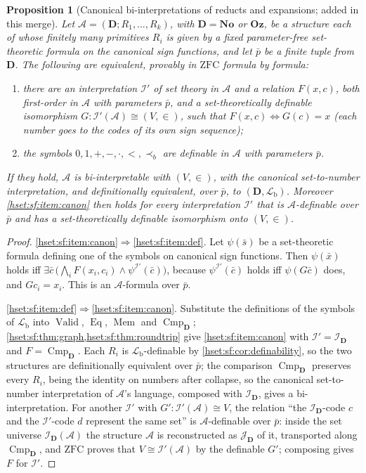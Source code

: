 \documentclass[11pt,letterpaper]{article}
\newtheorem{proposition}[proposition]{Proposition}\aliascntresetthe{proposition}
\theoremstyle{definition}
\theoremstyle{remark}
\newcommand{\No}{\mathbf{No}}
\newcommand{\I}{\mathcal I}
\newcommand{\J}{\mathcal J}
\newcommand{\ZFC}{\mathrm{ZFC}}
\newcommand{\Oz}{\mathbf{Oz}}
\newcommand{\precb}{\prec_b}
\newcommand{\Valid}{\operatorname{Valid}}
\newcommand{\Eqc}{\operatorname{Eq}}
\newcommand{\Memc}{\operatorname{Mem}}
\newcommand{\Cmp}{\operatorname{Cmp}}
\newcommand{\Dd}{\mathbf{D}}
\newcommand{\Lb}{\mathcal L_{\mathrm b}}
\begin{document}
\begin{proposition}[Canonical bi-interpretations of reducts and expansions; added in this merge]
\label{hset:sf:prop:reducts}
Let $\mathcal A=(\Dd;R_1,\ldots,R_k)$, with $\Dd=\No$ or $\Oz$, be a structure each
of whose finitely many primitives $R_i$ is given by a fixed parameter-free
set-theoretic formula on the canonical sign functions, and let $\bar p$ be a finite
tuple from $\Dd$. The following are equivalent, provably in $\ZFC$ formula by
formula:
\begin{enumerate}[label=(\alph*)]
\item\label{hset:sf:item:canon} there are an interpretation $\I'$ of set theory in
$\mathcal A$ and a relation $F(x,c)$, both first-order in $\mathcal A$ with
parameters $\bar p$, and a set-theoretically definable isomorphism
$G:\I'(\mathcal A)\cong(V,\in)$, such that $F(x,c)\iff G(c)=x$ (each number goes
to the codes of its own sign sequence);
\item\label{hset:sf:item:def} the symbols $0,1,+,-,\cdot,<,\precb$ are definable in
$\mathcal A$ with parameters $\bar p$.
\end{enumerate}
If they hold, $\mathcal A$ is bi-interpretable with $(V,\in)$, with the canonical
set-to-number interpretation, and definitionally equivalent, over $\bar p$, to
$(\Dd,\Lb)$. Moreover \ref{hset:sf:item:canon} then holds for every interpretation
$\I'$ that is $\mathcal A$-definable over $\bar p$ and has a set-theoretically
definable isomorphism onto $(V,\in)$.
\end{proposition}
\begin{proof}
\ref{hset:sf:item:canon}$\Rightarrow$\ref{hset:sf:item:def}. Let $\psi(\bar s)$ be
a set-theoretic formula defining one of the symbols on canonical sign functions.
Then $\psi(\bar x)$ holds iff
$\exists\bar c\,\bigl(\bigwedge_iF(x_i,c_i)\land\psi^{\I'}(\bar c)\bigr)$, because
$\psi^{\I'}(\bar c)$ holds iff $\psi(G\bar c)$ does, and $G c_i=x_i$. This is an
$\mathcal A$-formula over $\bar p$.

\ref{hset:sf:item:def}$\Rightarrow$\ref{hset:sf:item:canon}. Substitute the
definitions of the symbols of $\Lb$ into $\Valid$, $\Eqc$, $\Memc$ and
$\Cmp_{\Dd}$; \cref{hset:sf:thm:graph,hset:sf:thm:roundtrip} give
\ref{hset:sf:item:canon} with $\I'=\I_{\Dd}$ and $F=\Cmp_{\Dd}$. Each $R_i$ is
$\Lb$-definable by \cref{hset:sf:cor:definability}, so the two structures are
definitionally equivalent over $\bar p$; the comparison $\Cmp_{\Dd}$ preserves every
$R_i$, being the identity on numbers after collapse, so the canonical
set-to-number interpretation of $\mathcal A$'s language, composed with $\I_{\Dd}$,
gives a bi-interpretation. For another $\I'$ with
$G':\I'(\mathcal A)\cong V$, the relation ``the $\I_{\Dd}$-code $c$ and the
$\I'$-code $d$ represent the same set'' is $\mathcal A$-definable over $\bar p$:
inside the set universe $\I_{\Dd}(\mathcal A)$ the structure $\mathcal A$ is
reconstructed as $\J_{\Dd}$ of it, transported along $\Cmp_{\Dd}$, and $\ZFC$
proves that $V\cong\I'(\mathcal A)$ by the definable $G'$; composing gives $F$ for
$\I'$.
\end{proof}
\end{document}
